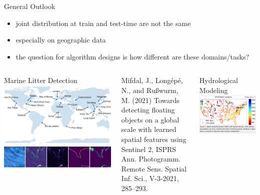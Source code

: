 \documentclass[11pt]{beamer}
\newcommand{\citeapa}[1]{ {\tiny#1\par} }
\begin{document}
	\begin{frame}{General Outlook}
		\begin{itemize}
			\item joint distribution at train and test-time are not the same
			\item especially on geographic data
			\item the question for algorithm designs is how different are these domains/tasks?
		\end{itemize}
	
		\vspace{1em}
	
		\begin{columns}[t]
			Marine Litter Detection
			\includegraphics[width=\textwidth]{figures/oceans_map}
			\includegraphics[width=\textwidth]{figures/oceans_predictions}
			\citeapa{Mifdal, J., Longépé, N., and Rußwurm, M. (2021) Towards detecting floating objects on a global scale with learned spatial features using Sentinel 2, ISPRS Ann. Photogramm. Remote Sens. Spatial Inf. Sci., V-3-2021, 285–293.}
			
			Hydrological Modeling
			\includegraphics[width=\textwidth]{images/camels}
			

\end{columns}
\end{frame}
\end{document}
